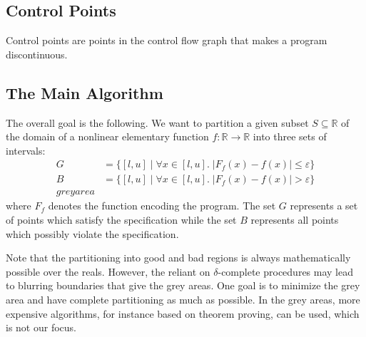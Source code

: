 \subsection{Control Points}

\begin{definition}
Control points are points in the control flow graph that makes a program discontinuous. 
\end{definition}





\subsection{The Main Algorithm}
The overall goal is the following. We want to partition a given subset $S \subseteq \mathbb{R}$ of the
domain of a nonlinear elementary function $f : \mathbb{R} \to
\mathbb{R}$ into three sets of intervals:
\begin{align*}
  G & = \{ [l, u] \mid \forall x \in [l, u]. \; | F_f(x) - f(x) | \le \varepsilon \}\\
  B & = \{ [l, u] \mid \forall x \in [l, u]. \; | F_f(x) - f(x) | > \varepsilon \}\\
  grey area &
\end{align*}
where $F_f$ denotes the function encoding the program. The set $G$
represents a set of points which satisfy the specification while the
set $B$ represents all points which possibly violate the
specification. 

Note that the partitioning into good and bad regions is always mathematically possible over the reals. However, the reliant on $\delta$-complete procedures may lead to blurring boundaries that give the grey areas. One goal is to minimize the grey area and have complete partitioning as much as possible. In the grey areas, more expensive algorithms, for instance based on theorem proving, can be used, which is not our focus.  

